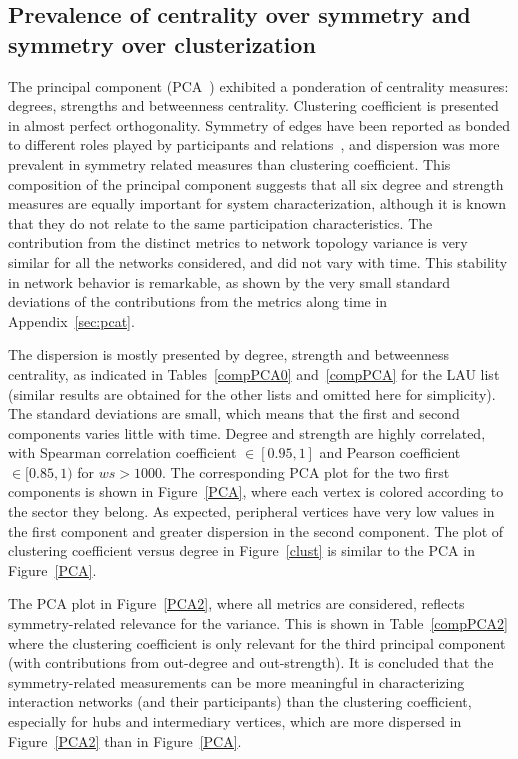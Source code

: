 \documentclass[%
 aip,
 jmp,%
 amsmath,amssymb,
 reprint,%
]{revtex4-1}
\begin{document}
    \subsection{Prevalence of centrality over symmetry and symmetry over clusterization}\label{prevalence}
The principal component (PCA~\cite{pca}) exhibited a ponderation of centrality measures: degrees, strengths and betweenness centrality. Clustering coefficient is presented in almost perfect orthogonality.
Symmetry of edges have been reported as bonded to different roles played by participants and relations~\cite{newmanEvolving}, and dispersion was more prevalent in symmetry related measures than clustering coefficient.
This composition of the principal component suggests that all six degree and strength measures are equally important for system characterization, although it is known that they do not relate to the same participation characteristics.
The contribution from the distinct metrics to network topology variance is very similar for all the networks considered, and did not vary with time. This stability in network behavior is remarkable, as shown by the very small standard deviations of the contributions from the metrics along time in Appendix~\ref{sec:pcat}.

The dispersion is mostly presented by degree, strength and betweenness centrality, as indicated in Tables~\ref{compPCA0} and~\ref{compPCA} for the LAU list (similar results are obtained for the other lists and omitted here for simplicity). The standard deviations are small, which means that the first and second components varies little with time.
 Degree and strength are highly correlated, with Spearman correlation coefficient $\in [0.95,1]$ and Pearson coefficient $\in [0.85,1)$ for $ws>1000$. The corresponding PCA plot for the two first components is shown in Figure~\ref{PCA}, where each vertex is colored according to the sector they belong. As expected, peripheral vertices have very low values in the first component and greater dispersion in the second component. 
The plot of clustering coefficient versus degree in Figure~\ref{clust} is similar to the PCA in Figure~\ref{PCA}.

The PCA plot in Figure~\ref{PCA2}, where all metrics are considered, reflects symmetry-related relevance for the variance. This is shown in Table~\ref{compPCA2}  where the clustering coefficient is only relevant for the third principal component (with contributions from out-degree and out-strength). It is concluded that the symmetry-related measurements can be more meaningful in characterizing interaction networks (and their participants) than the clustering coefficient, especially for hubs and intermediary vertices, which are more dispersed in Figure~\ref{PCA2} than in Figure~\ref{PCA}. 
\end{document}
